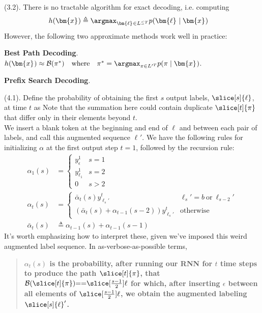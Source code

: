 \documentclass[11pt]{article}
\renewcommand\vec[2][]{\bm{#2}_{#1}}
\newcommand\myspace[1][]{\vspace{#1\bigskipamount}}
\newcommand\p{\Needspace{10\baselineskip} \noindent}
\begin{document}
\myspace
\p {} (3.2). There is no tractable algorithm for exact decoding, i.e. computing
\begin{align}
	h(\vec x) 
		&\triangleq \argmax_{\vec\ell \in L^{\le T}} p(\vec\ell \mid \vec x)
\end{align}
However, the following two approximate methods work well in practice:
\begin{compactenum}
	\item \textbf{Best Path Decoding}. $ h(\vec x) \approx \mathcal{B}(\pi^*) \quad \text{where} \quad \pi^* = \argmax_{\pi \in L'^T} p(\pi \mid \vec x)$. 
	
	\item \textbf{Prefix Search Decoding}.
\end{compactenum}

\myspace
\p {} (4.1). Define the probability of obtaining the first $s$ output labels, $\slice[s]{\ell}$, at time $t$ as 
Note that the summation here could contain duplicate $\slice[t]{\pi}$ that differ only in their elements beyond $t$. \\

\p We insert a blank token at the beginning and end of $\ell$ and between each pair of labels, and call this augmented sequence $\vec{\ell}'$. We have the following rules for initializing $\alpha$ at the first output step $t{=}1$, followed by the recursion rule:
\begin{align}
	\alpha_1(s) &= \begin{cases}
			y_{\epsilon}^1 & s{=}1 \\
			y_{ \vec[1]{\ell} }^1 & s{=}2 \\
			0 & s > 2
	\end{cases}\\
	\alpha_t(s)
		&= \begin{cases}
			\bar{\alpha}_t(s) y_{\vec[s]{\ell}' }^t 	& \vec[s]{\ell}' {=} b ~ \text{or} ~ \vec[s-2]{\ell}'  \\
			( \bar{\alpha}_t(s) + \alpha_{t-1}(s -2) ) y_{\vec[s]{\ell}' }^t  							& \text{otherwise}
		\end{cases}\\
	\bar{\alpha}_t(s)
		&\triangleq \alpha_{t-1}(s) + \alpha_{t-1}(s - 1)
\end{align}
It's worth emphasizing how to interpret these, given we've imposed this weird augmented label sequence. In as-verbose-as-possible terms, 
\begin{quote}
	{\bfseries
		$\alpha_t(s)$ is the probability, after running our RNN for $t$ time steps to produce the path $\slice[t]{\pi}$, that $\mathcal{B}(\slice[t]{\pi}){==}\slice[ \frac{s - 1}{2} ]{\ell}$  for which, after inserting $\epsilon$ between all elements of $\slice[ \frac{s-1}{2} ]{\ell}$, we obtain the augmented labeling $\slice[s]{\ell}'$.
	}
\end{quote}
\end{document}
